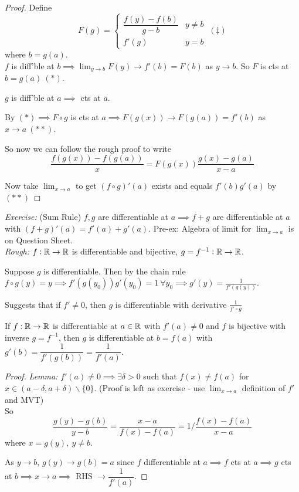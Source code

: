 \documentclass[10pt,twoside]{scrartcl}
\begin{document}
\begin{proof}
Define \[F(g) = \begin{cases}
 	\dfrac{f(y)-f(b)}{g-b} & y \neq b\\
 	f'(g) &  y = b 
 \end{cases}~(\ddagger)\]
 where $b = g(a)$. \vspace*{5pt}\\$f$ is diff'ble at $b \implies \lim_{y \to b} F(y) \to f'(b) = F(b)$ as $y \to b$. So $F$ is cts at $b = g(a) ~(*)$. 
 
 $g$ is diff'ble at $a \implies$ cts at $a$. 
 
 By $(*) \implies F \circ g$ is cts at $a \implies F(g(x)) \to F(g(a)) = f'(b)$ as $x \to a ~(**)$. 
 
 So now we can follow the rough proof to write 
 \[\frac{f(g(x)) -f(g(a))}{x} = F(g(x))\frac{g(x) - g(a)}{x-a}\]
 

 
 Now take $\lim_{x\to a}$ to get $(f\circ g)'(a)$ exists and equals $f'(b)g'(a)$ by $(**)$ \end{proof}
 
 \emph{Exercise:} (Sum Rule) $f, g$ are differentiable at $a\implies f+g$ are differentiable at $a$ with $(f+g)'(a) = f'(a) + g'(a)$. Pre-ex: Algebra of limit for $\lim_{x\to a}$ is on Question Sheet.\\
 
 \emph{Rough:} $f: \mathbb{R}\to \mathbb{R}$ is differentiable and bijective, $g = f^{-1}: \mathbb{R} \to \mathbb{R}$.
 
  Suppose $g$ is differentiable. Then by the chain rule $f\circ g(y) = y \implies f'(g(y_0))g'(y_0) = 1~\forall y_0 \implies g'(y) = \frac{1}{f'(g(y))}$. 
  
  Suggests that if $f' \neq 0$, then $g$ is differentiable with derivative $\frac{1}{f'\circ g}$\vspace*{5pt}

\begin{theorem}
	If $f:\mathbb{R} \to \mathbb{R}$ is differentiable at $a\in \mathbb{R}$ with $f'(a) \neq 0$ and $f$ is bijective with inverse $g = f^{-1}$, then $g$ is differentiable at $b = f(a)$ with $g'(b) = \dfrac{1}{f'(g(b))} = \dfrac{1}{f'(a)}.$
\end{theorem}
\begin{proof}
\textit{Lemma:} $f'(a) \neq 0 \implies \exists \delta > 0$ such that $f(x) \neq f(a)$ for $x \in (a-\delta,a + \delta)\backslash\{0\}$.  (Proof is left as exercise - use $\lim_{x\to a}$ definition of $f'$ and MVT) \\

 So \[\dfrac{g(y)-g(b)}{y-b} = \dfrac{x-a}{f(x) - f(a)} = 1/\dfrac{f(x)-f(a)}{x-a}\] where $x = g(y),~y \neq b$.
 
 As $y \to b$, $g(y) \to g(b) = a$ since $f$ differentiable at $a \implies f$ cts at $a \implies g$ cts at $b \implies x \to a \implies$ RHS $\to \dfrac{1}{f'(a)}$.	
\end{proof}\vspace*{15pt}
\end{document}
